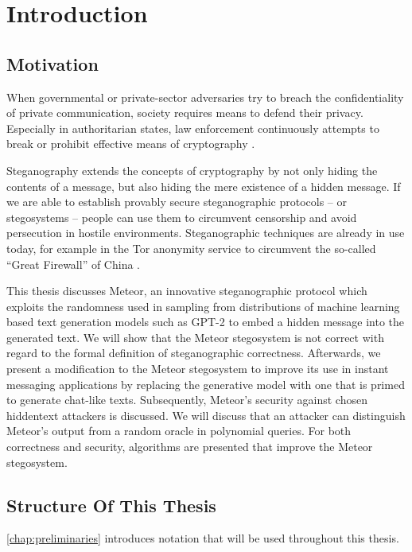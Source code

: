 \chapter{Introduction}

\section{Motivation}

When governmental or private-sector adversaries try to breach the confidentiality of private communication, society requires means to defend their privacy.
Especially in authoritarian states, law enforcement continuously attempts to break or prohibit effective means of cryptography \cite{TLSBlocking2020}.

Steganography extends the concepts of cryptography by not only hiding the contents of a message, but also hiding the mere existence of a hidden message.
If we are able to establish provably secure steganographic protocols -- or stegosystems -- people can use them to circumvent censorship and avoid persecution in hostile environments.
Steganographic techniques are already in use today, for example in the Tor anonymity service to circumvent the so-called ``Great Firewall'' of China \cite{TorBlocking2012}.

This thesis discusses Meteor, an innovative steganographic protocol which exploits the randomness used in sampling from distributions of machine learning based text generation models such as GPT-2 to embed a hidden message into the generated text.
We will show that the Meteor stegosystem is not correct with regard to the formal definition of steganographic correctness.
Afterwards, we present a modification to the Meteor stegosystem to improve its use in instant messaging applications by replacing the generative model with one that is primed to generate chat-like texts.
Subsequently, Meteor's security against chosen hiddentext attackers is discussed.
We will discuss that an attacker can distinguish Meteor's output from a random oracle in polynomial queries.
For both correctness and security, algorithms are presented that improve the Meteor stegosystem.


\section{Structure Of This Thesis}

\autoref{chap:preliminaries} introduces notation that will be used throughout this thesis.

